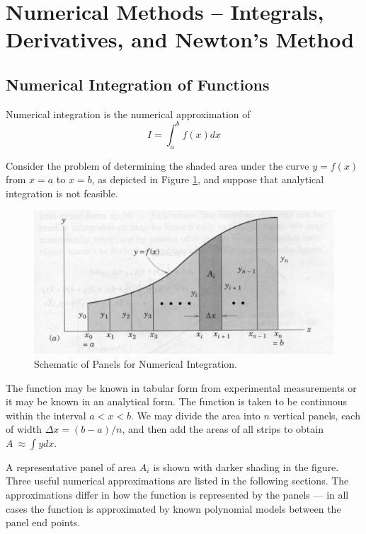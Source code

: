 \section{Numerical Methods -- Integrals, Derivatives, and Newton's Method}
\subsection{Numerical Integration of Functions}
Numerical integration is the numerical approximation of
\begin{equation}
I = \int_a^b f(x)dx
\end{equation}
 
Consider the problem of determining the shaded area under the curve $y = f(x)$ from $x = a$ to $x = b$, as depicted in Figure \ref{fig:IntegrationPanels}, and suppose that analytical integration is not feasible. 
 
\begin{figure}[h!] %
   \centering
   \includegraphics[width=5in]{./3-Differentation/IntegrationPanels.jpg} 
   \caption{Schematic of Panels for Numerical Integration. }
   \label{fig:IntegrationPanels}
\end{figure}

The function may be known in tabular form from experimental measurements or it may be known in an analytical form. 
The function is taken to be continuous within the interval $a < x < b$. 
We may divide the area into $n$ vertical panels, each of width $\Delta x = (b - a)/n$, and then add the areas of all strips to obtain  $A~\approx \int ydx$.

A representative panel of area $A_i$ is shown with darker shading in the figure. 
Three useful numerical approximations are listed in the following sections.    
The approximations differ in how the function is represented by the panels --- in all cases the function is approximated by known polynomial models between the panel end points.

